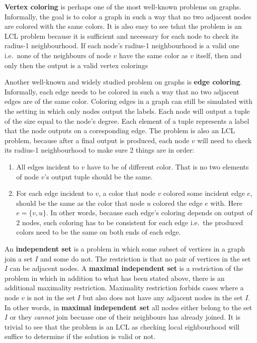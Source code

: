 \textbf{Vertex coloring} is perhaps one of the most well-known
problems on graphs. Informally, the goal is to color a graph
in such a way that no two adjacent nodes are colored with the
same colors. It is also easy to see tshat the problem is an
LCL problem because it is sufficient and necessary for each node to check
its radius-1 neighbourhood. If each node's radius-1 neighbourhood is
a valid one i.e.\ none of the neighbours of node $v$ have the same color as $v$
itself, then and only then the output is a valid vertex colorings

Another well-known and widely studied problem on graphs is
\textbf{edge coloring}. Informally, each edge needs to be
colored in such a way that no two adjacent edges are of the same
color. Coloring edges in a graph can still be simulated
with the setting in which only nodes output the labels.
Each node will output a tuple of the size equal to the node's
degree. Each element of a tuple represents a label
that the node outputs on a coresponding edge. The problem
is also an LCL problem, because after a final output is
produced, each node $v$ will need to check its radius-1
neighbourhood to make sure 2 things are in order:
\begin{enumerate}
  \item All edges incident to $v$ have to be of different color.
That is no two elements of node $v$'s output tuple should be the same.

  \item For each edge incident to $v$, a color that node $v$ colored some incident
edge $e$, should be the same as the color that node $u$ colored the edge $e$ with.
Here $e = \{v, u\}$. In other words, because each edge's coloring depends on
output of 2 nodes, such coloring has to be consistent for each edge i.e.\ the produced
colors need to be the same on both ends of each edge.
\end{enumerate}

An \textbf{independent set} is a problem in which some subset of vertices in a graph
join a set $I$ and some do not. The restriction is that no pair of vertices in the set $I$
can be adjacent nodes. A \textbf{maximal independent set} is a restriction of the
problem in which in addition to what has been stated above, there is an additional
maximality restriction. Maximality restriction forbids cases where a node $v$
is not in the set $I$ but also does not have any adjacent nodes in the set $I$.
In other words, in \textbf{maximal independent set} all nodes either belong
to the set $I$ or they \emph{cannot} join becuase one of their neighbours has
already joined. It is trivial to see that the problem is an LCL as checking local
eighbourhood will suffice to determine if the solution is valid or not.

